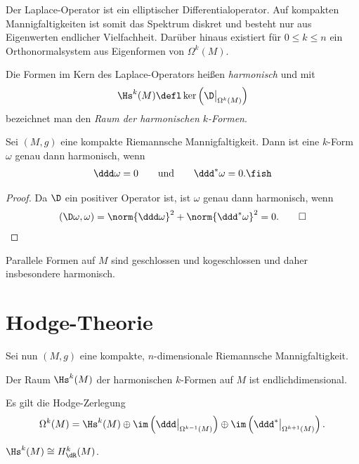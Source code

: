 \documentclass[%
	paper=a5,%
	fleqn,%
	DIV=18,%
	BCOR=0mm,
	fontsize=11pt,
	titlepage=false,%
	bibliography=totoc,
	DIV=18,%
	twoside=true,
	pdftitle=Riemannsche Geometrie,
	pdfauthor=Uwe Semmelmann,
	numbers=noendperiod]%
	{scrbook}
\begin{document}
\begin{rem}
Der Laplace-Operator ist ein elliptischer Differentialoperator. Auf kompakten Mannigfaltigkeiten ist somit das Spektrum diskret und besteht nur aus Eigenwerten endlicher Vielfachheit. Darüber hinaus existiert für $0\le k \le n$ ein Orthonormalsystem aus Eigenformen von $\Omega^k(M)$.\map
\end{rem}

\begin{defn}
Die Formen im Kern des Laplace-Operators heißen \emph{harmonisch} und mit
\begin{align*}
\Hs^k(M) \defl \ker\left(\D\big|_{\Omega^k(M)} \right)
\end{align*}
bezeichnet man den \emph{Raum der harmonischen $k$-Formen}.\fish
\end{defn}

\begin{lem}
Sei $(M,g)$ eine kompakte Riemannsche Mannigfaltigkeit. Dann ist eine $k$-Form $\omega$ genau dann harmonisch, wenn
\begin{align*}
\ddd\omega = 0\qquad \text{und}\qquad \ddd^*\omega = 0.\fish
\end{align*}
\end{lem}
\begin{proof}
Da $\D$ ein positiver Operator ist, ist $\omega$ genau dann harmonisch, wenn
\begin{align*}
(\D\omega,\omega) = \norm{\ddd\omega}^2 + \norm{\ddd^*\omega}^2 = 0.\qed
\end{align*}
\end{proof}

\begin{rem}
Parallele Formen auf $M$ sind geschlossen und kogeschlossen und daher insbesondere harmonisch.\map
\end{rem}

\section{Hodge-Theorie}

Sei nun $(M,g)$ eine kompakte, $n$-dimensionale Riemannsche Mannigfaltigkeit. 

\begin{prop}
\begin{propenum}
\item Der Raum $\Hs^k(M)$ der harmonischen $k$-Formen auf $M$ ist endlichdimensional.
\item Es gilt die Hodge-Zerlegung
\begin{align*}
\Omega^k(M) = \Hs^k(M)\oplus \im \left(\ddd\big|_{\Omega^{k-1}(M)}\right)
\oplus \im \left(\ddd^*\big|_{\Omega^{k+1}(M)}\right).
\end{align*}
\item $\Hs^k(M) \cong H_{\dR}^k(M)$.\fish
\end{propenum}
\end{prop}
\end{document}
